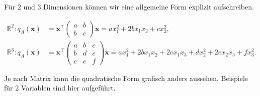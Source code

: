 Für 2 und 3 Dimensionen können wir eine allgemeine Form explizit aufschreiben. 

\begin{equation*}
    \begin{aligned}
        \mathbb{R}^2: q_A(\mathbf{x}) &= \mathbf{x}^\top \begin{pmatrix} a & b \\ b & c \end{pmatrix} \mathbf{x} = ax_1^2 + 2bx_1x_2 + cx_2^2, \\[1em]
        \mathbb{R}^3: q_A(\mathbf{x}) &= \mathbf{x}^\top \begin{pmatrix} a & b & c \\ b & d & e \\ c & e & f \end{pmatrix} \mathbf{x} = ax_1^2 + 2bx_1x_2 + 2cx_1x_3 + dx_2^2 + 2ex_2x_3 + fx_3^2.
    \end{aligned}
\end{equation*}

\vspace{0.25\baselineskip}

Je nach Matrix kann die quadratische Form grafisch anders aussehen. Beispiele für 2 Variablen sind hier aufgeführt.

